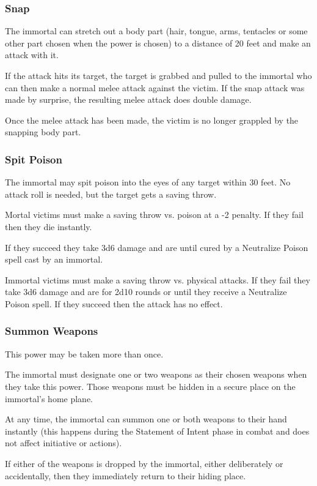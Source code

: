 \begin{multicols*}{2}
\subsubsection{Snap}
The immortal can stretch out a body part (hair, tongue, arms, tentacles or some other part chosen when the power is chosen) to a distance of 20 feet and make an attack with it.

If the attack hits its target, the target is grabbed and pulled to the immortal who can then make a normal melee attack against the victim. If the snap attack was made by surprise, the resulting melee attack does double damage.

Once the melee attack has been made, the victim is no longer grappled by the snapping body part.

\subsubsection{Spit Poison}
The immortal may spit poison into the eyes of any target within 30 feet. No attack roll is needed, but the target gets a saving throw.

Mortal victims must make a saving throw vs. poison at a -2 penalty. If they fail then they die instantly.

If they succeed they take 3d6 damage and are  until cured by a Neutralize Poison spell cast by an immortal.

Immortal victims must make a saving throw vs. physical attacks. If they fail they take 3d6 damage and are  for 2d10 rounds or until they receive a Neutralize Poison spell. If they succeed then the attack has no effect.

\subsubsection{Summon Weapons}
This power may be taken more than once.

The immortal must designate one or two weapons as their chosen weapons when they take this power. Those weapons must be hidden in a secure place on the immortal’s home plane.

At any time, the immortal can summon one or both weapons to their hand instantly (this happens during the Statement of Intent phase in combat and does not affect initiative or actions).

If either of the weapons is dropped by the immortal, either deliberately or accidentally, then they immediately return to their hiding place.


\end{multicols*}
